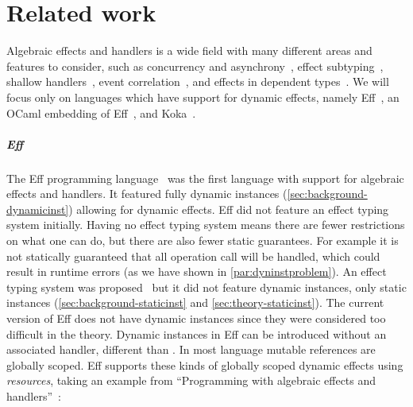 \chapter{\label{chap:related}Related work}

Algebraic effects and handlers is a wide field with many different areas and features to consider, such as concurrency and asynchrony~\autocites{concurrent,async}, effect subtyping~\autocite{effectsubtyping}, shallow handlers~\autocite{shallowhandlers}, event correlation~\autocite{eventcorrelation}, and effects in dependent types~\autocite{dependenttypes}.
We will focus only on languages which have support for dynamic effects, namely Eff~\autocite{eff1}, an OCaml embedding of Eff~\autocite{effdirectly}, and Koka~\autocites{koka,koka2}.

\paragraph{Eff} \label{sec:eff}
The Eff programming language~\autocite{eff1} was the first language with support for algebraic effects and handlers.
It featured fully dynamic instances (\cref{sec:background-dynamicinst}) allowing for dynamic effects.
Eff did not feature an effect typing system initially.
Having no effect typing system means there are fewer restrictions on what one can do, but there are also fewer static guarantees.
For example it is not statically guaranteed that all operation call will be handled, which could result in runtime errors (as we have shown in \cref{par:dyninstproblem}).
An effect typing system was proposed~\autocite{eff2} but it did not feature dynamic instances, only static instances (\cref{sec:background-staticinst} and \cref{sec:theory-staticinst}).
The current version of Eff does not have dynamic instances since they were considered too difficult in the theory.
Dynamic instances in Eff can be introduced without an associated handler, different than \lang{}.
In most language mutable references are globally scoped.
Eff supports these kinds of globally scoped dynamic effects using \emph{resources},
taking an example from ``Programming with algebraic effects and handlers''~\autocite{eff1}:

